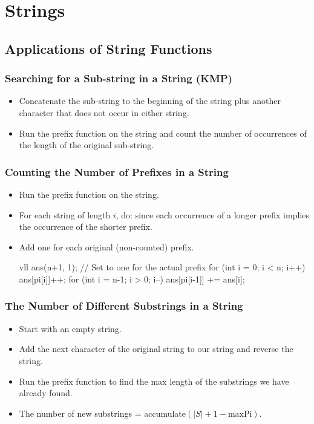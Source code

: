 \chapter{Strings}


\section{Applications of String Functions}

{\scriptsize
\subsection*{\small{Searching for a Sub-string in a String (KMP)}}
\begin{itemize}
    \item Concatenate the sub-string to the beginning of the string plus another character that does not occur in either string.
    \item Run the prefix function on the string and count the number of occurrences of the length of the original sub-string.
\end{itemize}

\subsection*{\small{Counting the Number of Prefixes in a String}}
\begin{itemize}
    \item Run the prefix function on the string.
    \item For each string of length $i$, do:
    since each occurrence of a longer prefix implies the occurrence of the shorter prefix.
    \item Add one for each original (non-counted) prefix.

    vll ans(n+1, 1); // Set to one for the actual prefix
    for (int i = 0; i < n; i++) ans[pi[i]]++;
    for (int i = n-1; i > 0; i--) ans[pi[i-1]] += ans[i];
\end{itemize}


\subsection*{\small{The Number of Different Substrings in a String}}
\begin{itemize}
    \item Start with an empty string.
    \item Add the next character of the original string to our string and reverse the string.
    \item Run the prefix function to find the max length of the substrings we have already found.
    \item The number of new substrings = accumulate$(|S| + 1 - \text{maxPi})$.
\end{itemize}

}
